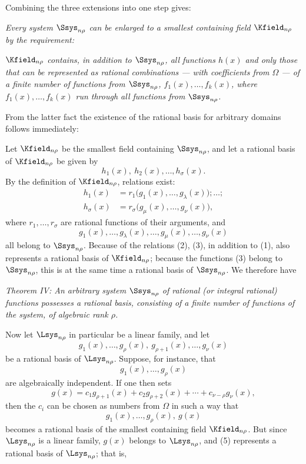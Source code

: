 \documentclass[11pt]{article}
\begin{document}
Combining the three extensions into one step gives:

\emph{Every system $\Ssys_{n\rho}$ can be enlarged to a smallest containing field $\Kfield_{n\rho}$ by the requirement:}

\emph{$\Kfield_{n\rho}$ contains, in addition to $\Ssys_{n\rho}$, all functions $h(x)$ and only those that can be represented as rational combinations --- with coefficients from $\Omega$ --- of a finite number of functions from $\Ssys_{n\rho}$, $f_1(x),\ldots,f_k(x)$, where $f_1(x),\ldots,f_k(x)$ run through all functions from $\Ssys_{n\rho}$.}

From the latter fact the existence of the rational basis for arbitrary domains follows immediately:

Let $\Kfield_{n\rho}$ be the smallest field containing $\Ssys_{n\rho}$, and let a rational basis of $\Kfield_{n\rho}$ be given by
\begin{equation}
  h_1(x),\ h_2(x),\ldots,h_\sigma(x).
\tag{1}
\end{equation}
By the definition of $\Kfield_{n\rho}$, relations exist:
\begin{equation}
\begin{aligned}
 h_1(x)&=r_1\bigl(g_1(x),\ldots,g_\lambda(x)\bigr);\ldots;\\
 h_\sigma(x)&=r_\sigma\bigl(g_\mu(x),\ldots,g_\nu(x)\bigr),
\end{aligned}
\tag{2}
\end{equation}
where $r_1,
\ldots,r_\sigma$ are rational functions of their arguments, and
\begin{equation}
  g_1(x),\ldots,g_\lambda(x),\ldots,
  g_\mu(x),\ldots,g_\nu(x)
\tag{3}
\end{equation}
all belong to $\Ssys_{n\rho}$. Because of the relations (2), (3), in addition to (1), also represents a rational basis of $\Kfield_{n\rho}$; because the functions (3) belong to $\Ssys_{n\rho}$, this is at the same time a rational basis of $\Ssys_{n\rho}$. We therefore have

\emph{Theorem IV: An arbitrary system $\Ssys_{n\rho}$ of rational (or integral rational) functions possesses a rational basis, consisting of a finite number of functions of the system, of algebraic rank $\rho$.}

Now let $\Lsys_{n\rho}$ in particular be a linear family, and let
\begin{equation}
  g_1(x),\ldots,g_\rho(x),\ g_{\rho+1}(x),\ldots,g_\nu(x)
\tag{4}
\end{equation}
be a rational basis of $\Lsys_{n\rho}$. Suppose, for instance, that
\[
  g_1(x),\ldots,g_\rho(x)
\]
are algebraically independent. If one then sets
\[
  g(x)=c_1g_{\rho+1}(x)+c_2g_{\rho+2}(x)+\cdots+c_{\nu-\rho}g_\nu(x),
\]
then the $c_i$ can be chosen as numbers from $\Omega$ in such a way that
\begin{equation}
  g_1(x),\ldots,g_\rho(x),\ g(x)
\tag{5}
\end{equation}
becomes a rational basis of the smallest containing field $\Kfield_{n\rho}$. But since $\Lsys_{n\rho}$ is a linear family, $g(x)$ belongs to $\Lsys_{n\rho}$, and (5) represents a rational basis of $\Lsys_{n\rho}$; that is,
\end{document}
